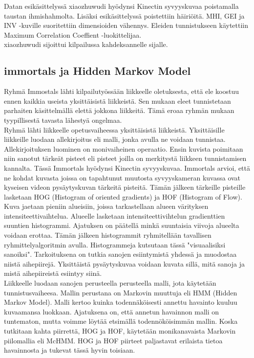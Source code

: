Datan esikäsittelyssä xiaozhuwudi hyödynsi Kinectin syvyyskuvaa poistamalla taustan ihmishahmolta. Lisäksi esikäsittelyssä poistettiin häiriöitä.
MHI, GEI ja INV -kuville suoritettiin dimensioiden vähennys. Eleiden tunnistukseen käytettiin Maximum Correlation Coeffient -luokittelijaa. \citep {6239179}\\

xiaozhuwudi sijoittui kilpailussa kahdeksannelle sijalle. 



\subsection{immortals ja Hidden Markov Model}

Ryhmä Immostals lähti kilpailutyössään liikkeelle oletuksesta, että ele koostuu ennen kaikkia useista yksittäisistä liikkeistä. 
Sen mukaan eleet tunnistetaan parhaiten käsittelmällä elettä jokkona liikkeitä. Tämä eroaa ryhmän mukaan tyypillisestä 
tavasta lähestyä ongelmaa.\\

Ryhmä lähti liikkeelle opetusvaiheessa yksittäisistä liikkeistä. Yksittäisille liikkeille luodaan allekirjoitus eli malli,
jonka avulla ne voidaan tunnistaa. Allekirjoituksen luominen on monivaiheinen operaatio. Ensin kuvista poimitaan niin sanotut
tärkeät pisteet eli pisteet joilla on merkitystä liikkeen tunnistamisen kannalta. Tässä Immortals hyödynsi Kinectin syvyyskuvaa.
Immortals arvioi, että ne kohdat kuvasta joissa on tapahtunut muutosta syvyyskameran kuvassa ovat kyseisen videon pysäytyskuvan
tärkeitä pisteitä. Tämän jälkeen tärkeille pisteille lasketaan HOG (Histogram of oriented gradients) ja HOF (Histogram of Flow). 
Kuva jaetaan pieniin alueisiin, joissa tarkastellaan alueen värityksen intensiteettivaihtelua.
Alueelle lasketaan intensiteettivihtelun gradienttien suuntien histogrammi. Ajatuksen on päätellä minkä suuntaisia 
viivoja alueelta voidaan erottaa. Tämän jälkeen histogrammit ryhmitellään tavallisen ryhmittelyalgoritmin avulla.
Histogrammeja kutsutaan tässä "visuaalisiksi sanoiksi". Tarkoituksena on tutkia sanojen esiintymistä yhdessä ja muodostaa niistä aihepiirejä. 
Yksittäistä pysäytyskuvaa voidaan kuvata sillä, mitä sanoja ja mistä aihepiireistä esiintyy siinä.\\

Liikkeelle luodaan sanojen perusteella perusteella malli, jota käytetään tunnistusvaiheesa. Mallin perustana on Markovin muuttuja
eli HMM (Hidden Markov Model). Malli kertoo kuinka todennäköisesti annettu havainto kuuluu kuvaamansa luokkaan. 
Ajatuksena on, että annetun havainnon malli on tuntematon, mutta voimme löytää etsimällä todennököisimmän mallin.
Koska tutkitaan kahta piirrettä, HOG ja HOF, käytetään monikanavaista Markovin piilomallia eli McHMM. 
HOG ja HOF piirteet paljastavat erilaista tietoa havainnosta ja tukevat tässä hyvin toisiaan.\\

